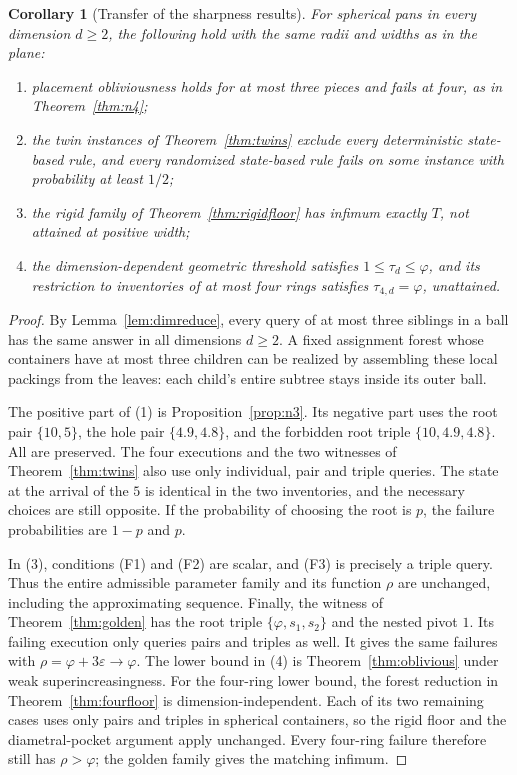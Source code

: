 \documentclass[11pt]{article}
\newtheorem{corollary}[theorem]{Corollary}
\theoremstyle{definition}
\begin{document}
\begin{corollary}[Transfer of the sharpness results]\label{cor:dimsharp}
For spherical pans in every dimension $d\ge2$, the following hold with
the same radii and widths as in the plane:
\begin{enumerate}
\item placement obliviousness holds for at most three pieces and fails
  at four, as in Theorem~\ref{thm:n4};
\item the twin instances of Theorem~\ref{thm:twins} exclude every
  deterministic state-based rule, and every randomized state-based
  rule fails on some instance with probability at least $1/2$;
\item the rigid family of Theorem~\ref{thm:rigidfloor} has infimum
  exactly $T$, not attained at positive width;
\item the dimension-dependent geometric threshold satisfies
  $1\le\tau_d\le\varphi$, and its restriction to inventories of
  at most four rings satisfies $\tau_{4,d}=\varphi$, unattained.
\end{enumerate}
\end{corollary}
\begin{proof}
By Lemma~\ref{lem:dimreduce}, every query of at most three siblings
in a ball has the same answer in all dimensions $d\ge2$. A fixed
assignment forest whose containers have at most three children can
be realized by assembling these local packings from the leaves:
each child's entire subtree stays inside its outer ball.

The positive part of (1) is Proposition~\ref{prop:n3}. Its negative
part uses the root pair $\{10,5\}$, the hole pair $\{4.9,4.8\}$,
and the forbidden root triple $\{10,4.9,4.8\}$. All are preserved.
The four executions and the two witnesses of Theorem~\ref{thm:twins}
also use only individual, pair and triple queries. The state at the
arrival of the $5$ is identical in the two inventories, and the
necessary choices are still opposite. If the probability of choosing
the root is $p$, the failure probabilities are $1-p$ and $p$.

In (3), conditions (F1) and (F2) are scalar, and (F3) is precisely
a triple query. Thus the entire admissible parameter family and its
function $\rho$ are unchanged, including the approximating sequence.
Finally, the witness of Theorem~\ref{thm:golden} has the root triple
$\{\varphi,s_1,s_2\}$ and the nested pivot $1$. Its failing execution
only queries pairs and triples as well. It gives the same failures
with $\rho=\varphi+3\varepsilon\to\varphi$. The lower bound in (4)
is Theorem~\ref{thm:oblivious} under weak superincreasingness.
For the four-ring lower bound, the forest reduction in
Theorem~\ref{thm:fourfloor} is dimension-independent. Each of its
two remaining cases uses only pairs and triples in spherical
containers, so the rigid floor and the diametral-pocket argument
apply unchanged. Every four-ring failure therefore still has
$\rho>\varphi$; the golden family gives the matching infimum.
\end{proof}
\end{document}
